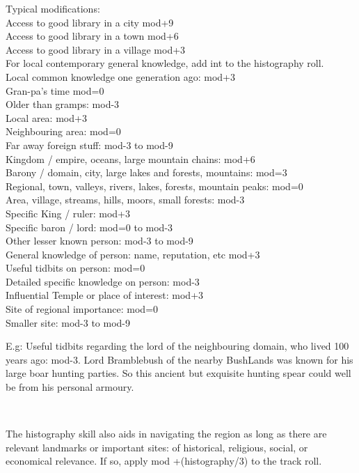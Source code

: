 \noindent
Typical modifications:\\
Access to good library in a city mod+9\\
Access to good library in a town mod+6\\
Access to good library in a village mod+3\\
For local contemporary general knowledge, add int to the histography roll.\\
Local common knowledge one generation ago: mod+3\\
Gran-pa's time mod=0\\
Older than gramps: mod-3\\
Local area: mod+3\\
Neighbouring area: mod=0\\
Far away foreign stuff: mod-3 to mod-9\\
Kingdom / empire, oceans, large mountain chains: mod+6\\
Barony / domain, city, large lakes and forests, mountains: mod=3\\
Regional, town, valleys, rivers, lakes, forests, mountain peaks: mod=0\\
Area, village, streams, hills, moors, small forests: mod-3\\
Specific King / ruler: mod+3\\
Specific baron / lord: mod=0 to mod-3\\
Other lesser known person: mod-3 to mod-9\\
General knowledge of person: name, reputation, etc mod+3\\
Useful tidbits on person: mod=0\\
Detailed specific knowledge on person: mod-3\\
Influential Temple or place of interest: mod+3\\
Site of regional importance: mod=0\\
Smaller site: mod-3 to mod-9

E.g: Useful tidbits regarding the lord of the neighbouring domain, who lived 100 years ago: mod-3. Lord Bramblebush of the nearby BushLands was known for his large boar hunting parties. So this ancient but exquisite hunting spear could well be from his personal armoury.

\

The histography skill also aids in navigating the region as long as there are relevant landmarks or important sites: of historical, religious, social, or economical relevance. If so, apply mod +(histography/3) to the track roll.


